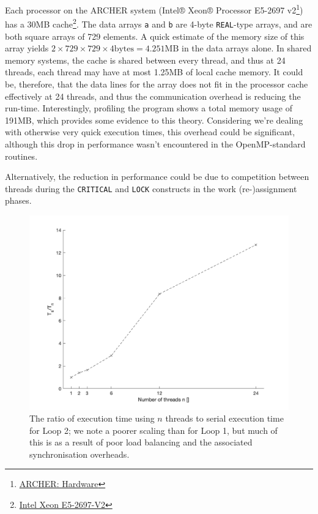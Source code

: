 \documentclass{article} %
\newcommand{\tp}{\texttt}
\begin{document}
Each processor on the ARCHER system (Intel® Xeon® Processor E5-2697 v2\footnote{\href{http://archer.ac.uk/about-archer/hardware/}{ARCHER: Hardware}}) has a 30MB cache\footnote{\href{https://ark.intel.com/content/www/us/en/ark/products/75283/intel-xeon-processor-e5-2697-v2-30m-cache-2-70-ghz.html}{Intel Xeon E5-2697-V2}}.
The data arrays \tp{a} and \tp{b} are 4-byte \tp{REAL}-type arrays, and are both square arrays of 729 elements.
A quick estimate of the memory size of this array yields $2 \times 729 \times 729 \times 4 \text{bytes} = 4.251\text{MB}$ in the data arrays alone.
In shared memory systems, the cache is shared between every thread, and thus at 24 threads, each thread may have at most 1.25MB of local cache memory.
It could be, therefore, that the data lines for the array does not fit in the processor cache effectively at 24 threads, and thus the communication overhead is reducing the run-time.
Interestingly, profiling the program shows a total memory usage of 191MB, which provides some evidence to this theory.
Considering we're dealing with otherwise very quick execution times, this overhead could be significant, although this drop in performance wasn't encountered in the OpenMP-standard routines.

Alternatively, the reduction in performance could be due to competition between threads during the  
\tp{CRITICAL} and \tp{LOCK} constructs in the work (re-)assignment phases.

\begin{figure}
    \centering
    \includegraphics[height=.35\textheight]{part2_plots/speedup_affinity_loop2.png}
    \caption{The ratio of execution time using $n$ threads to serial execution time for Loop 2; we note a poorer scaling than for Loop 1, but much of this is as a result of poor load balancing and the associated synchronisation overheads.}
\end{figure}
\end{document}
